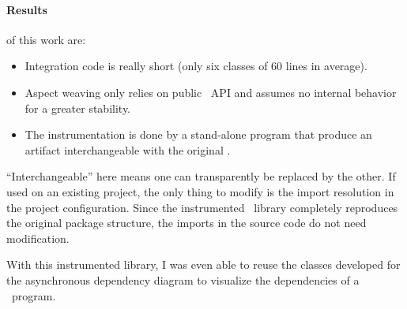 \paragraph{Results} of this work are:
\begin{itemize}
\item Integration code is really short (only six classes of 60 lines in average).
\item Aspect weaving only relies on public \vertx\ API and assumes no internal behavior for a greater stability.
\item The instrumentation is done by a stand-alone program that produce an artifact interchangeable with the original \vertx.
\end{itemize}

``Interchangeable'' here means one can transparently be replaced by the other. If used on an existing project, the only thing to modify is the import resolution in the project configuration. Since the instrumented \vertx\ library completely reproduces the original package structure, the imports in the source code do not need modification.

With this instrumented library, I was even able to reuse the classes developed for the asynchronous dependency diagram to visualize the dependencies of a \vertx\ program.


